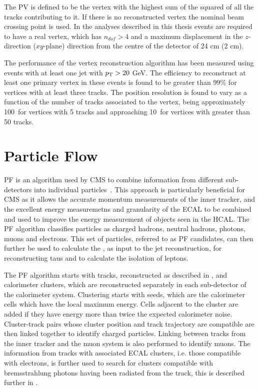 The \ac{PV} is defined to be the vertex with the highest sum of the squared \pt of all the tracks contributing to it. If there is no reconstructed vertex the nominal beam crossing point is used. In the analyses described in this thesis events are required to have a real vertex, which has $n_{dof}>4$ and a maximum displacement in the $z$-direction ($xy$-plane) direction from the centre of the detector of 24 cm (2 cm).

The performance of the vertex reconstruction algorithm has been measured using events with at least one jet with $p_{\mathrm{T}}>20$ GeV. The efficiency to reconstruct at least one primary vertex in these events is found to be greater than 99\% for vertices with at least three tracks. The position resolution is found to vary as a function of the number of tracks associated to the vertex, being approximately 100\micron\, for vertices with 5 tracks and approaching 10\micron\, for vertices with greater than 50 tracks.

\section{Particle Flow}
\label{sec:pf}
\ac{PF} is an algorithm used by CMS to combine information from different sub-detectors into individual particles~\cite{CMS-PAS-PFT-09-001,CMS-PAS-PFT-10-001,CMS-PAS-PFT-10-002}. This approach is particularly beneficial for CMS as it allows the accurate momentum measurements of the inner tracker, and the excellent energy measuremetns and granularity of the \ac{ECAL} to be combined and used to improve the energy measurement of objects seen in the \ac{HCAL}. The \ac{PF} algorithm classifies particles as charged hadrons, neutral hadrons, photons, muons and electrons. This set of particles, referred to as \ac{PF} candidates, can then further be used to calculate the \MET, as input to the jet reconstruction, for reconstructing taus and to calculate the isolation of leptons.

The \ac{PF} algorithm starts with tracks, reconstructed as described in , and calorimeter clusters, which are reconstructed separately in each sub-detector of the calorimeter system. Clustering starts with seeds, which are the calorimeter cells which have the local maximum energy. Cells adjacent to the cluster are added if they have energy more than twice the expected calorimeter noise. Cluster-track pairs whose cluster position and track trajectory are compatible are then linked together to identify charged particles. Linking between tracks from the inner tracker and the muon system is also performed to identify muons. The information from tracks with associated \ac{ECAL} clusters, i.e. those compatible with electrons, is further used to search for clusters compatible with bremsstrahlung photons having been radiated from the track, this is described further in .

